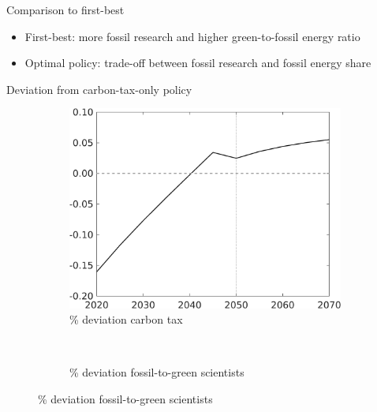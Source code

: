 \documentclass[11pt,aspectratio=169]{beamer}
\begin{document}
\begin{frame}{Comparison to first-best}
\begin{figure}
\begin{subfigure}{0.4\textwidth}
		\end{subfigure}
	\end{figure}
	\vspace{3mm}
	\begin{block}{}
		\begin{itemize}
			\item<+-> First-best: more fossil research and higher green-to-fossil energy ratio
			\item<+-> Optimal policy: trade-off between fossil research and fossil energy share
		\end{itemize}
	\end{block}	
\end{frame}

\begin{frame}{Deviation from carbon-tax-only policy}
\vspace{-3mm}
\pause
\centering
\begin{figure}
	\begin{subfigure}{0.42\textwidth}
		\caption{{\% deviation carbon tax}}
		\includegraphics[width=1\textwidth]{../codding_model/own_basedOnFried/optimalPol_010922_revision/figures/all_13Sept22_Tplus30/Tauf_OPT_T_NoTaus_COMPtaulPer_regime4_spillover0_knspil0_noskill0_sep0_xgrowth0_PV1_etaa0.79.png}
	\end{subfigure}
	\begin{minipage}[]{0.1\textwidth}
		\
	\end{minipage}
	\begin{subfigure}{0.4\textwidth}
		\caption{{\% deviation fossil-to-green scientists }}

\end{subfigure}
\end{figure}
\end{frame}
\end{document}
